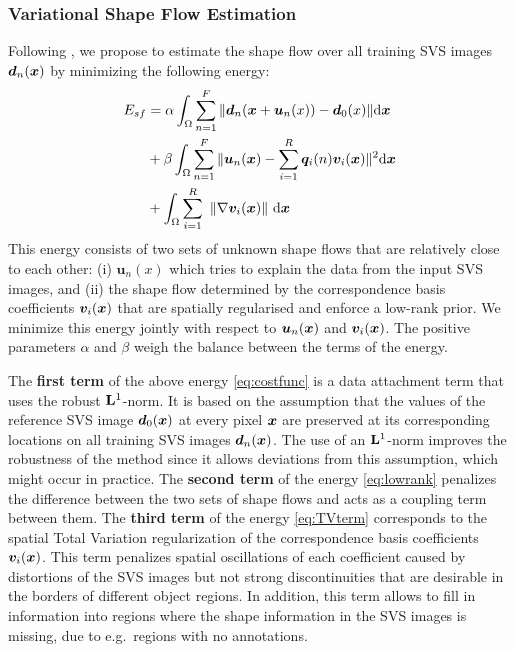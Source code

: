 \subsubsection{Variational Shape Flow Estimation}%
\label{varshapeflow}

Following \cite{Garg:2013hu}, we propose to estimate the shape flow over all training SVS images $\bm{d}_n(\boldsymbol{x})$ by minimizing the following energy:
\begin{align}
E_{sf} & =\alpha
\int_{\Omega}\sum_{n=1}^F \|\bm{d}_n(\boldsymbol{x}+\bm{u}_n(x))-\bm{d}_0(x)\| \mathrm{d} \boldsymbol{x} \label{eq:costfunc}\\
    &+ \beta \int_{\Omega}\sum_{n=1}^F\|\bm{u}_n(\boldsymbol{x})-\sum_{i=1}^R\bm{q}_i(n)\bm{v}_i(\boldsymbol{x})\|^2 \mathrm{d} \boldsymbol{x} \label{eq:lowrank}\\
    &+
\int_\Omega  \sum_{i=1}^R \,\, \left \|    \nabla \bm{v}_i(\boldsymbol{x})    \right \|  \,\mathrm{d} \boldsymbol{x} \label{eq:TVterm}
\end{align}
This energy consists of two sets of unknown shape flows that are relatively close to each other: (i) $\bm{u}_n(x)$ which tries to explain the data from the input SVS images, and (ii) the shape flow determined by the correspondence basis coefficients $\bm{v}_i(\boldsymbol{x})$ that are spatially regularised and enforce a low-rank prior. We minimize this energy jointly with respect to $\bm{u}_n(\boldsymbol{x})$ and $\bm{v}_i(\boldsymbol{x})$. The positive parameters $\alpha$ and $\beta$ weigh the balance between the terms of the energy.

The \textbf{first term} of the above energy \eqref{eq:costfunc} is a data attachment term
that uses the robust $\mathbf{L}^1$-norm.  It is based on the assumption that the values of the reference SVS image $\bm{d}_0(\boldsymbol{x})$ at every pixel $\boldsymbol{x}$ are preserved at its corresponding locations on all training SVS images $\bm{d}_n(\boldsymbol{x})$. The use of an $\mathbf{L}^1$-norm improves the robustness of the method since it allows deviations from this assumption, which might occur in practice.
The \textbf{second term} of the energy \eqref{eq:lowrank} penalizes the difference between the two sets  of shape flows and acts as a coupling term between them.
The \textbf{third term} of the energy \eqref{eq:TVterm} corresponds to the spatial Total Variation regularization \cite{rudin92} of
the correspondence basis coefficients $\bm{v}_i(\boldsymbol{x})$.
This term penalizes spatial oscillations of each coefficient caused by distortions of the SVS images but not strong discontinuities that are desirable in the borders of different object regions. In addition, this term allows to fill in information into regions where the shape information in the SVS images is missing, due to e.g.~regions with no annotations.

